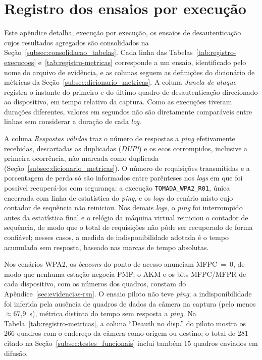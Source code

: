 
\chapter{Registro dos ensaios por execução}
\label{sec:registro-execucoes}

Este apêndice detalha, execução por execução, os ensaios de desautenticação cujos resultados agregados são consolidados na Seção~\ref{subsec:consolidacao_tabelas}. Cada linha das Tabelas~\ref{tab:registro-execucoes} e~\ref{tab:registro-metricas} corresponde a um ensaio, identificado pelo nome do arquivo de evidência, e as colunas seguem as definições do dicionário de métricas da Seção~\ref{subsec:dicionario_metricas}. A coluna \textit{Janela de ataque} registra o instante do primeiro e do último quadro de desautenticação direcionado ao dispositivo, em tempo relativo da captura. Como as execuções tiveram durações diferentes, valores em segundos não são diretamente comparáveis entre linhas sem considerar a duração de cada \textit{log}.

A coluna \textit{Respostas válidas} traz o número de respostas a \textit{ping} efetivamente recebidas, descartadas as duplicadas (\textit{DUP!}) e os ecos corrompidos, inclusive a primeira ocorrência, não marcada como duplicada (Seção~\ref{subsec:dicionario_metricas}). O número de requisições transmitidas e a porcentagem de perda só são informados entre parênteses nos \textit{logs} em que foi possível recuperá-los com segurança: a execução \texttt{TOMADA\_WPA2\_R01}, única encerrada com linha de estatística do \textit{ping}, e os \textit{logs} do cenário misto cujo contador de sequência não reiniciou. Nos demais \textit{logs}, o \textit{ping} foi interrompido antes da estatística final e o relógio da máquina virtual reiniciou o contador de sequência, de modo que o total de requisições não pôde ser recuperado de forma confiável; nesses casos, a medida de indisponibilidade adotada é o tempo acumulado sem resposta, baseado nas marcas de tempo absolutas.

Nos cenários WPA2, os \textit{beacons} do ponto de acesso anunciam MFPC~=~0, de modo que nenhuma estação negocia PMF; o AKM e os bits MFPC/MFPR de cada dispositivo, com os números dos quadros, constam do Apêndice~\ref{sec:evidencias-rsn}. O ensaio piloto não teve \textit{ping}; a indisponibilidade foi inferida pela ausência de quadros de dados da câmera na captura (pelo menos $\approx$67,9~s), métrica distinta do tempo sem resposta a \textit{ping}. Na Tabela~\ref{tab:registro-metricas}, a coluna ``Deauth no disp.'' do piloto mostra os 266 quadros com o endereço da câmera como origem ou destino; o total de 281 citado na Seção~\ref{subsec:testes_funcionais} inclui também 15 quadros enviados em difusão.

